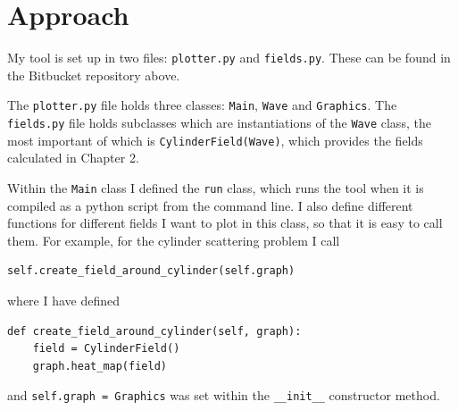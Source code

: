 \section{Approach}
%
My tool is set up in two files: \verb!plotter.py! and \verb!fields.py!. These can be found in the Bitbucket repository above. \par
%
The \verb!plotter.py! file holds three classes: \verb!Main!, \verb!Wave! and \verb!Graphics!. The \verb!fields.py! file holds subclasses which are instantiations of the \verb!Wave! class, the most important of which is \verb!CylinderField(Wave)!, which provides the fields calculated in Chapter 2.\par
%
Within the \verb!Main! class I defined the \verb!run! class, which runs the tool when it is compiled as a python script from the command line. I also define different functions for different fields I want to plot in this class, so that it is easy to call them. For example, for the cylinder scattering problem I call
%
  \begin{lstlisting}
self.create_field_around_cylinder(self.graph) \end{lstlisting}
%
where I have defined
%
  \begin{lstlisting}
def create_field_around_cylinder(self, graph):
    field = CylinderField()
    graph.heat_map(field) \end{lstlisting}
%
and \verb!self.graph = Graphics! was set within the \verb!__init__! constructor method.
%

